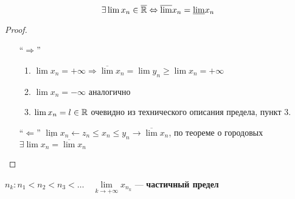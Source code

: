 \begin{theorem}
    $$\exists \lim x_n \in \overline{\mathbb{R}} \Leftrightarrow \overline \lim x_n = \underline \lim x_n$$
\end{theorem}
\begin{proof}
    \begin{itemize}
        \item [``$\Rightarrow$''] \begin{enumerate}
            \item $\lim x_n = +\infty \Rightarrow \overline \lim x_n = \lim y_n \geq \lim x_n=+\infty$
            \item $\lim x_n = -\infty$ аналогично
            \item $\lim x_n = l\in\mathbb{R}$ очевидно из технического описания предела, пункт 3.
            \end{enumerate}
        \item [``$\Leftarrow$''] $\underline \lim x_n \leftarrow z_n\leq x_n \leq y_n\to \overline \lim x_n$, по теореме о городовых $\exists \lim x_n=\overline \lim x_n$
    \end{itemize}
\end{proof}

\begin{definition}
    $n_k : n_1 < n_2 < n_3 < \ldots \quad \lim\limits_{k\to +\infty} x_{n_k}$ --- \textbf{частичный предел}
\end{definition}

